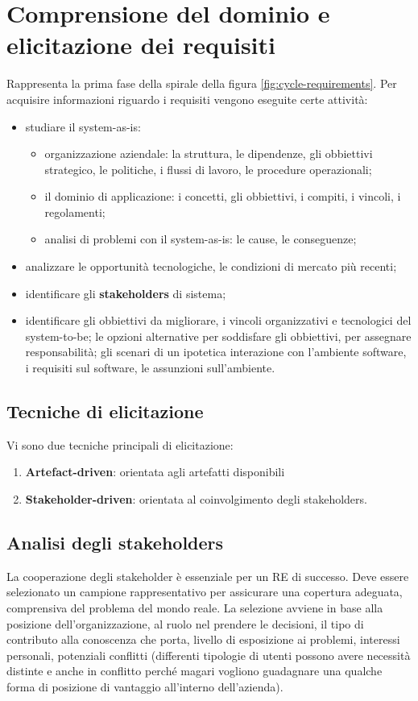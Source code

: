 \documentclass[italian]{article}
\begin{document}
	\section{Comprensione del dominio e elicitazione dei requisiti}
	Rappresenta la prima fase della spirale della figura \ref{fig:cycle-requirements}.
	Per acquisire informazioni riguardo i requisiti vengono eseguite certe attività:
	\begin{itemize}
		\item studiare il system-as-is:
		\begin{itemize}
			\item organizzazione aziendale: la struttura, le dipendenze, gli obbiettivi strategico, le politiche, i flussi di lavoro, le procedure operazionali;
			\item il dominio di applicazione: i concetti, gli obbiettivi, i compiti, i vincoli, i regolamenti;
			\item analisi di problemi con il system-as-is: le cause, le conseguenze;
		\end{itemize}
		\item analizzare le opportunità tecnologiche, le condizioni di mercato più recenti;
		\item identificare gli \textbf{stakeholders} di sistema;
		\item identificare gli obbiettivi da migliorare, i vincoli organizzativi e tecnologici del system-to-be; le opzioni alternative per soddisfare gli obbiettivi, per assegnare responsabilità; gli scenari di un ipotetica interazione con l'ambiente software, i requisiti sul software, le assunzioni sull'ambiente.
	\end{itemize}
	 \subsection{Tecniche di elicitazione}
	 Vi sono due tecniche principali di elicitazione:
	 \begin{enumerate}
	 	\item \textbf{Artefact-driven}: orientata agli artefatti disponibili
	 	\item \textbf{Stakeholder-driven}: orientata al coinvolgimento degli stakeholders.
	 \end{enumerate}
	 \subsection{Analisi degli stakeholders}
	 La cooperazione degli stakeholder è essenziale per un RE di successo. Deve essere selezionato un campione rappresentativo per assicurare una copertura adeguata, comprensiva del problema del mondo reale.
	 La selezione avviene in base alla posizione dell'organizzazione, al ruolo nel prendere le decisioni, il tipo di contributo alla conoscenza che porta, livello di esposizione ai problemi, interessi personali, potenziali conflitti (differenti tipologie di utenti possono avere necessità distinte e anche in conflitto perché magari vogliono guadagnare una qualche forma di posizione di vantaggio all'interno dell'azienda).
\end{document}
